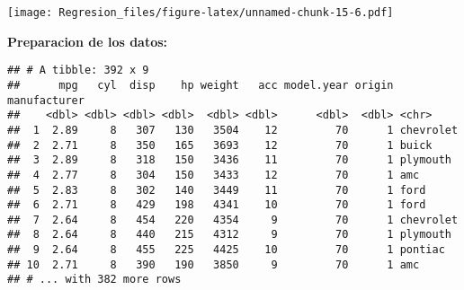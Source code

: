 \documentclass[]{article}
\newenvironment{Shaded}{\begin{snugshade}}{\end{snugshade}}
\newcommand{\CommentTok}[1]{\textcolor[rgb]{0.56,0.35,0.01}{\textit{#1}}}
\newcommand{\DecValTok}[1]{\textcolor[rgb]{0.00,0.00,0.81}{#1}}
\newcommand{\KeywordTok}[1]{\textcolor[rgb]{0.13,0.29,0.53}{\textbf{#1}}}
\newcommand{\NormalTok}[1]{#1}
\newcommand{\OperatorTok}[1]{\textcolor[rgb]{0.81,0.36,0.00}{\textbf{#1}}}
\newcommand{\StringTok}[1]{\textcolor[rgb]{0.31,0.60,0.02}{#1}}
\begin{document}
\texttt{[image: Regresion\_files/figure-latex/unnamed-chunk-15-6.pdf]}

\textbf{Preparacion de los datos:}

\begin{Shaded}
\end{Shaded}

\begin{verbatim}
## # A tibble: 392 x 9
##      mpg   cyl  disp    hp weight   acc model.year origin manufacturer
##    <dbl> <dbl> <dbl> <dbl>  <dbl> <dbl>      <dbl>  <dbl> <chr>       
##  1  2.89     8   307   130   3504    12         70      1 chevrolet   
##  2  2.71     8   350   165   3693    12         70      1 buick       
##  3  2.89     8   318   150   3436    11         70      1 plymouth    
##  4  2.77     8   304   150   3433    12         70      1 amc         
##  5  2.83     8   302   140   3449    11         70      1 ford        
##  6  2.71     8   429   198   4341    10         70      1 ford        
##  7  2.64     8   454   220   4354     9         70      1 chevrolet   
##  8  2.64     8   440   215   4312     9         70      1 plymouth    
##  9  2.64     8   455   225   4425    10         70      1 pontiac     
## 10  2.71     8   390   190   3850     9         70      1 amc         
## # ... with 382 more rows
\end{verbatim}
\end{document}
